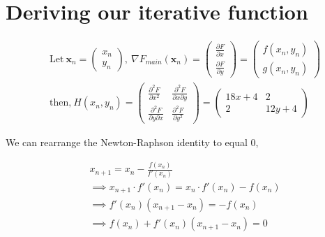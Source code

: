 \documentclass[../main.tex]{subfiles}
\begin{document}
    \section{Deriving our iterative function}\label{sec:2d-nr-deriving-iterative-function}
    \begin{center*}
        \begin{align*}
            & \text{Let} \ \mathbf{x}_{n} =
            \begin{pmatrix}
            x_{n} \\
            y_{n}
            \end{pmatrix}, \
            \nabla F_{main}(\mathbf{x}_{n}) =
            \begin{pmatrix}
                \frac{\partial F}{\partial x} \\
                \frac{\partial F}{\partial y}
            \end{pmatrix} =
            \begin{pmatrix}
                f(x_{n}, y_{n}) \\
                g(x_{n}, y_{n})
            \end{pmatrix} \\
            & \text{then,} \ H(x_{n}, y_{n}) =
            \begin{pmatrix}
                \frac{\partial^{2} F}{\partial x^{2}} & \frac{\partial^{2} F}{\partial x \partial y} \\
                \frac{\partial^{2} F}{\partial y \partial x} & \frac{\partial^{2} F}{\partial y^{2}}
            \end{pmatrix} =
            \begin{pmatrix}
                18x + 4 & 2 \\
                2 & 12y + 4
            \end{pmatrix}
        \end{align*}
    \end{center*}
    We can rearrange the Newton-Raphson identity to equal $0$,
    \begin{center*}
        \begin{align*}
            & x_{n + 1} = x_{n} - \frac{f(x_{n})}{f'(x_{n})} \\
            & \implies x_{n + 1} \cdot f'(x_{n}) = x_{n} \cdot f'(x_{n}) - f(x_{n}) \\
            & \implies f'(x_{n})(x_{n + 1} - x_{n}) = -f(x_{n}) \\
            & \implies f(x_{n}) + f'(x_{n})(x_{n + 1} - x_{n}) = 0
        \end{align*}
    \end{center*}
\end{document}
